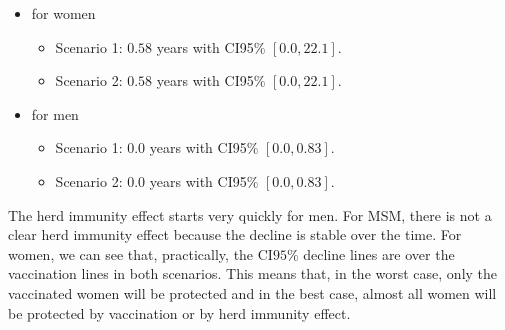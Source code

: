 \begin{itemize}
	\item for women
	\begin{itemize}
		\item Scenario 1: $0.58$ years with CI95\% $[0.0, 22.1]$.
		\item Scenario 2: $0.58$ years with CI95\% $[0.0, 22.1]$.
	\end{itemize}
	\item for men
	\begin{itemize}
		\item Scenario 1: $0.0$ years with CI95\% $[0.0,0.83]$.
		\item Scenario 2: $0.0$ years with CI95\% $[0.0,0.83]$.	
	\end{itemize}
\end{itemize}

The herd immunity effect starts very quickly for men. For MSM, there is not a clear herd immunity effect because the decline is stable over the time. For women, we can see that, practically, the CI$95\%$ decline lines are over the vaccination lines in both scenarios. This means that, in the worst case, only the vaccinated women will be protected and in the best case, almost all women will be protected by vaccination or by herd immunity effect.

